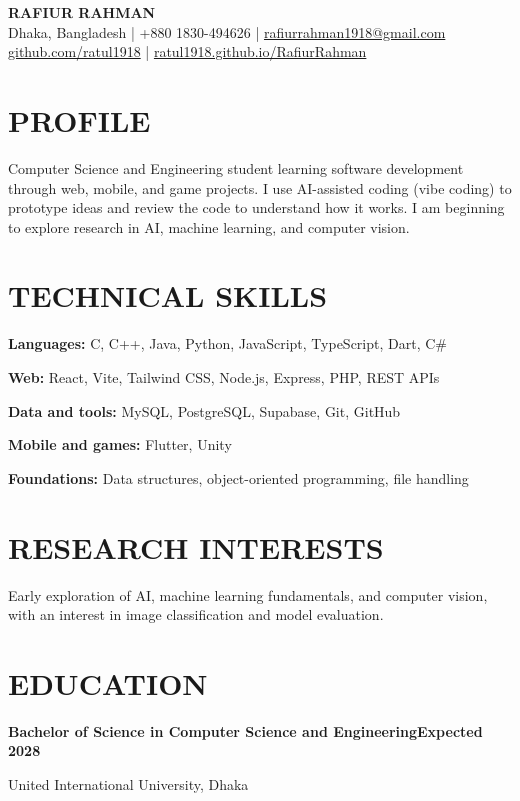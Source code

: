 \documentclass[10pt,a4paper]{article}
\begin{document}
\begin{center}
  {\LARGE\textbf{RAFIUR RAHMAN}}\\[4pt]
  Dhaka, Bangladesh \quad | \quad +880 1830-494626 \quad | \quad
  \href{mailto:rafiurrahman1918@gmail.com}{rafiurrahman1918@gmail.com}\\[3pt]
  \href{https://github.com/ratul1918}{github.com/ratul1918}
  \quad | \quad
  \href{https://ratul1918.github.io/RafiurRahman/}{ratul1918.github.io/RafiurRahman}
\end{center}

\section*{PROFILE}
Computer Science and Engineering student learning software development through web, mobile, and game projects. I use AI-assisted coding (vibe coding) to prototype ideas and review the code to understand how it works. I am beginning to explore research in AI, machine learning, and computer vision.

\section*{TECHNICAL SKILLS}
\textbf{Languages:} C, C++, Java, Python, JavaScript, TypeScript, Dart, C\#\par
\textbf{Web:} React, Vite, Tailwind CSS, Node.js, Express, PHP, REST APIs\par
\textbf{Data and tools:} MySQL, PostgreSQL, Supabase, Git, GitHub\par
\textbf{Mobile and games:} Flutter, Unity\par
\textbf{Foundations:} Data structures, object-oriented programming, file handling

\section*{RESEARCH INTERESTS}
Early exploration of AI, machine learning fundamentals, and computer vision, with an interest in image classification and model evaluation.

\section*{EDUCATION}
\textbf{Bachelor of Science in Computer Science and Engineering}\hfill\textbf{Expected 2028}\par
United International University, Dhaka
\end{document}
